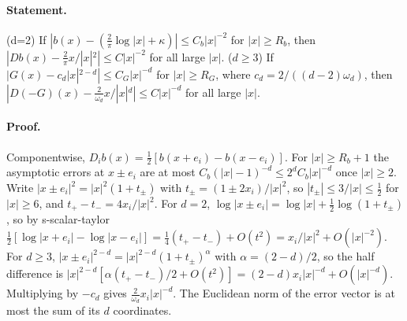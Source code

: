 \paragraph{Statement.} (d=2) If $|b(x)-(\frac2\pi\log|x|+\kappa)|\leq C_b|x|^{-2}$ for $|x|\geq R_b$, then
$|Db(x)-\frac2\pi x/|x|^2|\leq C|x|^{-2}$ for all large $|x|$. ($d\geq3$) If $|G(x)-c_d|x|^{2-d}|\leq C_G|x|^{-d}$ for
$|x|\geq R_G$, where $c_d=2/((d-2)\omega_d)$, then $|D(-G)(x)-\frac2{\omega_d}x/|x|^d|\leq C|x|^{-d}$ for all large $|x|$.
\paragraph{Proof.} Componentwise, $D_ib(x)=\frac12[b(x+e_i)-b(x-e_i)]$. For $|x|\geq R_b+1$ the asymptotic errors
at $x\pm e_i$ are at most $C_b(|x|-1)^{-d}\leq2^dC_b|x|^{-d}$ once $|x|\geq2$. Write
$|x\pm e_i|^2=|x|^2(1+t_\pm)$ with $t_\pm=(1\pm2x_i)/|x|^2$, so $|t_\pm|\leq3/|x|\leq\frac12$ for $|x|\geq6$, and
$t_+-t_-=4x_i/|x|^2$. For $d=2$, $\log|x\pm e_i|=\log|x|+\frac12\log(1+t_\pm)$, so by s-scalar-taylor
$\frac12[\log|x+e_i|-\log|x-e_i|]=\frac14(t_+-t_-)+O(t^2)=x_i/|x|^2+O(|x|^{-2})$. For $d\geq3$,
$|x\pm e_i|^{2-d}=|x|^{2-d}(1+t_\pm)^\alpha$ with $\alpha=(2-d)/2$, so the half difference is
$|x|^{2-d}[\alpha(t_+-t_-)/2+O(t^2)]=(2-d)x_i|x|^{-d}+O(|x|^{-d})$. Multiplying by $-c_d$ gives
$\frac2{\omega_d}x_i|x|^{-d}$. The Euclidean norm of the error vector is at most the sum of its $d$ coordinates.
